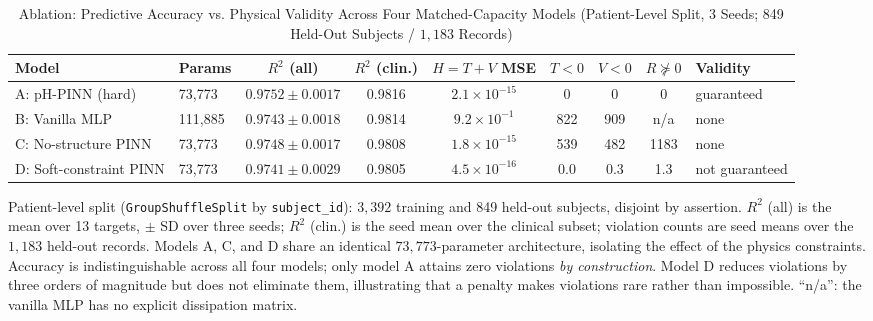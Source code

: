 \documentclass[journal]{IEEEtran}
\begin{document}
\begin{table}[!t]
\caption{Ablation: Predictive Accuracy vs. Physical Validity Across Four Matched-Capacity Models (Patient-Level Split, 3 Seeds; 849 Held-Out Subjects / $1{,}183$ Records)}
\label{tab:ablation}
\centering
\footnotesize
\begin{tabular}{llccccccl}
\hline
\textbf{Model} & \textbf{Params} & \textbf{$R^2$ (all)} & \textbf{$R^2$ (clin.)} & \textbf{$H{=}T{+}V$ MSE} & \textbf{$T<0$} & \textbf{$V<0$} & \textbf{$R\not\succeq0$} & \textbf{Validity}\\
\hline
A: pH-PINN (hard) & 73{,}773 & $0.9752{\pm}0.0017$ & 0.9816 & $2.1\times10^{-15}$ & 0 & 0 & 0 & guaranteed\\
B: Vanilla MLP & 111{,}885 & $0.9743{\pm}0.0018$ & 0.9814 & $9.2\times10^{-1}$ & 822 & 909 & n/a & none\\
C: No-structure PINN & 73{,}773 & $0.9748{\pm}0.0017$ & 0.9808 & $1.8\times10^{-15}$ & 539 & 482 & 1183 & none\\
D: Soft-constraint PINN & 73{,}773 & $0.9741{\pm}0.0029$ & 0.9805 & $4.5\times10^{-16}$ & 0.0 & 0.3 & 1.3 & not guaranteed\\
\hline
\end{tabular}

\vspace{2pt}
\begin{minipage}{\textwidth}
\footnotesize Patient-level split (\texttt{GroupShuffleSplit} by \texttt{subject\_id}): $3{,}392$ training and 849 held-out subjects, disjoint by assertion. $R^2$ (all) is the mean over 13 targets, $\pm$ SD over three seeds; $R^2$ (clin.) is the seed mean over the clinical subset; violation counts are seed means over the $1{,}183$ held-out records. Models A, C, and D share an identical $73{,}773$-parameter architecture, isolating the effect of the physics constraints. Accuracy is indistinguishable across all four models; only model A attains zero violations \emph{by construction}. Model D reduces violations by three orders of magnitude but does not eliminate them, illustrating that a penalty makes violations rare rather than impossible. ``n/a'': the vanilla MLP has no explicit dissipation matrix.
\end{minipage}
\end{table}
\end{document}
